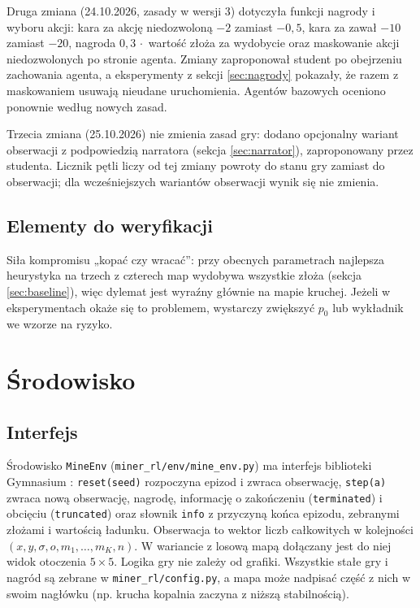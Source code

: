 \documentclass[11pt,a4paper]{article}
\begin{document}
Druga zmiana (24.10.2026, zasady w wersji 3) dotyczyła funkcji nagrody i wyboru
akcji: kara za akcję niedozwoloną $-2$ zamiast $-0{,}5$, kara za zawał $-10$
zamiast $-20$, nagroda $0{,}3\,\cdot$ wartość złoża za wydobycie oraz maskowanie
akcji niedozwolonych po stronie agenta. Zmiany zaproponował student po obejrzeniu
zachowania agenta, a eksperymenty z sekcji \ref{sec:nagrody} pokazały, że razem
z maskowaniem usuwają nieudane uruchomienia. Agentów bazowych oceniono ponownie
według nowych zasad.

Trzecia zmiana (25.10.2026) nie zmienia zasad gry: dodano opcjonalny wariant
obserwacji z podpowiedzią narratora (sekcja \ref{sec:narrator}), zaproponowany przez
studenta. Licznik pętli liczy od tej zmiany powroty do stanu gry zamiast do
obserwacji; dla wcześniejszych wariantów obserwacji wynik się nie zmienia.

\subsection{Elementy do weryfikacji}
Siła kompromisu „kopać czy wracać”: przy obecnych parametrach najlepsza
heurystyka na trzech z czterech map wydobywa wszystkie złoża (sekcja
\ref{sec:baseline}), więc dylemat jest wyraźny głównie na mapie kruchej. Jeżeli
w eksperymentach okaże się to problemem, wystarczy zwiększyć $p_0$ lub wykładnik
we wzorze na ryzyko.

\section{Środowisko}
\subsection{Interfejs}
Środowisko \texttt{MineEnv} (\texttt{miner\_rl/env/mine\_env.py}) ma interfejs
biblioteki Gymnasium \cite{gymnasium}: \texttt{reset(seed)} rozpoczyna epizod
i zwraca obserwację, \texttt{step(a)} zwraca nową obserwację, nagrodę,
informację o zakończeniu (\texttt{terminated}) i obcięciu
(\texttt{truncated}) oraz słownik \texttt{info} z przyczyną końca epizodu,
zebranymi złożami i wartością ładunku. Obserwacja to wektor liczb całkowitych
w kolejności $(x, y, \sigma, o, m_1,\dots,m_K, n)$. W wariancie z losową mapą
dołączany jest do niej widok otoczenia $5\times 5$. Logika gry nie zależy od
grafiki. Wszystkie stałe gry i nagród są zebrane w
\texttt{miner\_rl/config.py}, a mapa może nadpisać część z nich w swoim nagłówku
(np. krucha kopalnia zaczyna z niższą stabilnością).
\end{document}
